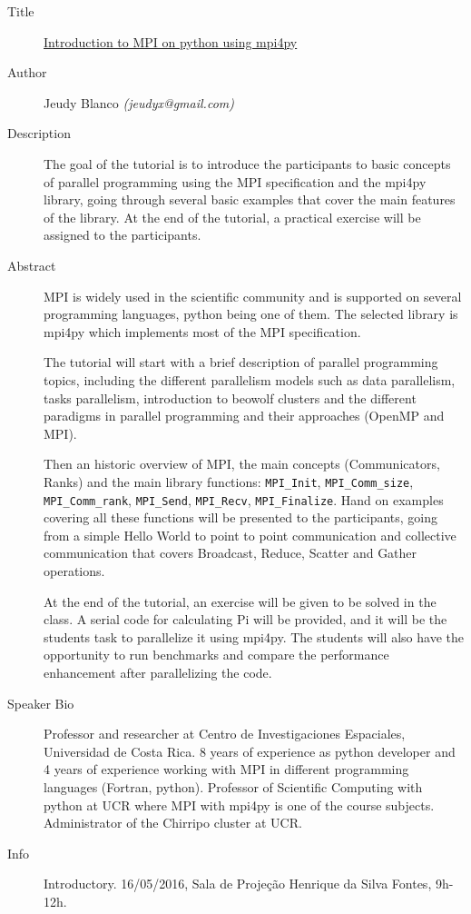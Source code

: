 \begin{description}
   \item[Title] \underline{Introduction to MPI on python using mpi4py}
   \item[Author] Jeudy Blanco \emph{(jeudyx@gmail.com)}
   \item[Description] The goal of the tutorial is to introduce the participants to basic concepts of parallel programming using the MPI specification and the mpi4py library, going through several basic examples that cover the main features of the library. At the end of the tutorial, a practical exercise will be assigned to the participants.  
   \item[Abstract] MPI is widely used in the scientific community and is supported on several programming languages, python being one of them. The selected library is mpi4py which implements most of the MPI specification.

The tutorial will start with a brief description of parallel programming topics, including the different parallelism models such as data parallelism, tasks parallelism, introduction to beowolf clusters and the different paradigms in parallel programming and their approaches (OpenMP and MPI).

Then an historic overview of MPI, the main concepts (Communicators, Ranks) and the main library functions: \verb+MPI_Init+, \verb+MPI_Comm_size+, \verb+MPI_Comm_rank+, \verb+MPI_Send+, \verb+MPI_Recv+, \verb+MPI_Finalize+. Hand on examples covering all these functions will be presented to the participants, going from a simple Hello World to point to point communication and collective communication that covers Broadcast, Reduce, Scatter and Gather operations.

At the end of the tutorial, an exercise will be given to be solved in the class. A serial code for calculating Pi will be provided, and it will be the students task to parallelize it using mpi4py. The students will also have the opportunity to run benchmarks and compare the performance enhancement after parallelizing the code.
    \item[Speaker Bio] Professor and researcher at Centro de Investigaciones Espaciales, Universidad de Costa Rica. 8 years of experience as python developer and 4 years of experience working with MPI in different programming languages (Fortran, python). Professor of Scientific Computing with python at UCR where MPI with mpi4py is one of the course subjects. Administrator of the Chirripo cluster at UCR.
    \item[Info] Introductory. 16/05/2016, Sala de Projeção Henrique da Silva Fontes, 9h-12h.
\end{description} 
